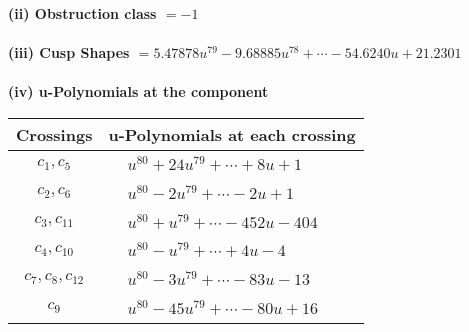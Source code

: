 \documentclass[1p]{elsarticle_modified}
\theoremstyle{definition}
\begin{document}
\flushleft \textbf{(ii) Obstruction class $= -1$}\\~\\
\flushleft \textbf{(iii) Cusp Shapes $= 5.47878 u^{79}-9.68885 u^{78}+\cdots-54.6240 u+21.2301$}\\~\\
\newpage\renewcommand{\arraystretch}{1}
\flushleft \textbf{(iv) u-Polynomials at the component}\newline \\
\begin{tabular}{m{50pt}|m{274pt}}
Crossings & \hspace{64pt}u-Polynomials at each crossing \\
\hline $$\begin{aligned}c_{1},c_{5}\end{aligned}$$&$\begin{aligned}
&u^{80}+24 u^{79}+\cdots+8 u+1
\end{aligned}$\\
\hline $$\begin{aligned}c_{2},c_{6}\end{aligned}$$&$\begin{aligned}
&u^{80}-2 u^{79}+\cdots-2 u+1
\end{aligned}$\\
\hline $$\begin{aligned}c_{3},c_{11}\end{aligned}$$&$\begin{aligned}
&u^{80}+u^{79}+\cdots-452 u-404
\end{aligned}$\\
\hline $$\begin{aligned}c_{4},c_{10}\end{aligned}$$&$\begin{aligned}
&u^{80}- u^{79}+\cdots+4 u-4
\end{aligned}$\\
\hline $$\begin{aligned}c_{7},c_{8},c_{12}\end{aligned}$$&$\begin{aligned}
&u^{80}-3 u^{79}+\cdots-83 u-13
\end{aligned}$\\
\hline $$\begin{aligned}c_{9}\end{aligned}$$&$\begin{aligned}
&u^{80}-45 u^{79}+\cdots-80 u+16
\end{aligned}$\\
\hline
\end{tabular}\\~\\
\end{document}
